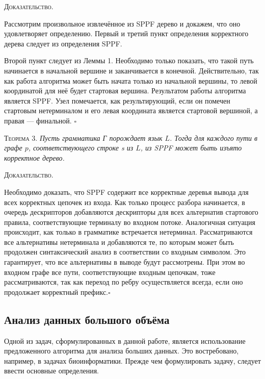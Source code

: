 \textsc{Доказательство.}

Рассмотрим произвольное извлечённое из SPPF дерево и докажем, что оно удовлетворяет определению. Первый и третий пункт определения корректного дерева следует из определения SPPF. 

Второй пункт следует из Леммы 1. Необходимо только показать, что такой путь начинается в начальной вершине и заканчивается в конечной. Действительно, так как работа алгоритма может быть начата только из начальной вершины, то левой координатой для неё будет стартовая вершина. Результатом работы алгоритма является SPPF. Узел помечается, как результирующий, если он помечен стартовым нетерминалом и его левая координата является стартовой вершиной, а правая --- финальной. $\square$

\textsc{Теорема 3.} 
\textit{Пусть грамматика Г порождает язык $L$. Тогда для каждого пути в графе $p$, соответствующего строке s из $L$, из SPPF может быть изъято корректное дерево.}

\textsc{Доказательство.}

Необходимо доказать, что SPPF содержит все корректные деревья вывода для всех корректных цепочек из входа. Как только процесс разбора начинается, в очередь дескрипторов добавляются дескрипторы для всех альтернатив стартового правила, соответствующие терминалу во входном потоке. Аналогичная ситуация происходит, как только в грамматике встречается нетерминал. Рассматриваются все альтернативы нетерминала и добавляются те, по которым может быть продолжен синтаксический анализ в соответствии со входным символом. Это гарантирует, что все альтернативы в выводе будут рассмотрены. При этом во входном графе все пути, соответствующие входным цепочкам, тоже рассматриваются, так как переход по ребру осуществляется всегда, если оно продолжает корректный префикс.$\square$

\subsection{Анализ данных большого объёма}
Одной из задач, сформулированных в данной работе, является использование предложенного алгоритма для анализа больших данных. Это востребовано, например, в задачах биоинформатики. Прежде чем формулировать задачу, следует ввести основные определения.

